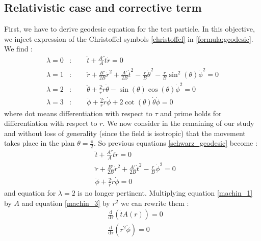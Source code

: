 \subsection{Relativistic case and corrective term}

First, we have to derive geodesic equation for the test particle. In this objective, we inject expression of the Christoffel symbols
\eqref{christoffel} in \eqref{formula:geodesic}. We find :
%
\begin{subequations}\label{schwarz_geodesic}
  \begin{align}
	\lambda = 0 &: \qquad \ddot{t} + \frac{A'}{A}
	\dot{t}\dot{r}
	=0 \\
	\lambda = 1 &: \qquad \ddot{r} + \frac{B'}{2B}{\dot{r}}^2 + \frac{A'}{2B}{\dot{t}}^2
	- \frac{r}{B} {\dot{\theta}}^2 - \frac{r}{B}\sin^2(\theta) {\dot{\phi}}^2
	=0 \\
	\lambda = 2 &: \qquad \ddot{\theta} + \frac{2}{r}\dot{r}\dot{\theta}
	- \sin(\theta)\cos(\theta){\dot{\phi}}^2
	= 0 \\
	\lambda = 3 &: \qquad \ddot{\phi} + \frac{2}{r}\dot{r}\dot{\phi} + 2\cot(\theta)\dot{\theta}\dot{\phi}
	=0
  \end{align}
\end{subequations}
%
where dot means differentiation with respect to $\tau$ and prime holds for differentiation with respect to $r$.
We now consider in the remaining of our study and without loss of generality (since the field is isotropic) that the movement
takes place in the plan $\theta = \frac{\pi}{2}$. So previous equations \eqref{schwarz_geodesic} become :
%
\begin{subequations}
  \begin{align}
	&\ddot{t} + \frac{A'}{A} \dot{t}\dot{r} =0 \label{machin_1} \\
	&\ddot{r} + \frac{B'}{2B}{\dot{r}}^2 + \frac{A'}{2B}{\dot{t}}^2 - \frac{r}{B}{\dot{\phi}}^2 = 0 \label{machin_2}\\
	&\ddot{\phi} + \frac{2}{r}\dot{r}\dot{\phi} = 0 \label{machin_3}
  \end{align}
\end{subequations}
%
and equation for $\lambda = 2$ is no longer pertinent.
Multiplying equation \eqref{machin_1} by $A$ and equation \eqref{machin_3} by $r^2$ we can rewrite them :
%
\begin{subequations}
\begin{align}
 &\frac{\mathrm{d}}{\mathrm{d}\tau}\left(\dot{t}A(r)\right) = 0\\
 &\frac{\mathrm{d}}{\mathrm{d}\tau}\left(r^2\dot{\phi}\right) = 0
 \end{align}
\end{subequations}
